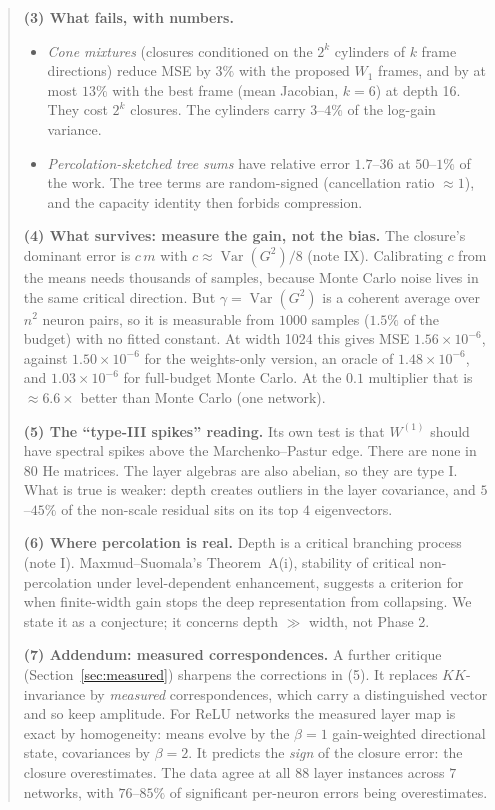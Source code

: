 \documentclass[11pt]{article}
\theoremstyle{definition}
\theoremstyle{remark}
\begin{document}
\begin{abstract}
\textbf{(3) What fails, with numbers.}
\begin{itemize}
\item \emph{Cone mixtures} (closures conditioned on the $2^k$ cylinders of $k$ frame directions) reduce MSE by $3\%$ with the proposed $W_1$ frames, and by at most $13\%$ with the best frame (mean Jacobian, $k=6$) at depth 16. They cost $2^k$ closures. The cylinders carry $3$--$4\%$ of the log-gain variance.
\item \emph{Percolation-sketched tree sums} have relative error $1.7$--$36$ at $50$--$1\%$ of the work. The tree terms are random-signed (cancellation ratio $\approx1$), and the capacity identity then forbids compression.
\end{itemize}

\textbf{(4) What survives: measure the gain, not the bias.} The closure's dominant error is $c\,m$ with $c\approx\operatorname{Var}(G^2)/8$ (note IX). Calibrating $c$ from the means needs thousands of samples, because Monte Carlo noise lives in the same critical direction. But $\gamma=\operatorname{Var}(G^2)$ is a coherent average over $n^2$ neuron pairs, so it is measurable from $1000$ samples ($1.5\%$ of the budget) with no fitted constant. At width 1024 this gives MSE $1.56\times10^{-6}$, against $1.50\times10^{-6}$ for the weights-only version, an oracle of $1.48\times10^{-6}$, and $1.03\times10^{-6}$ for full-budget Monte Carlo. At the $0.1$ multiplier that is $\approx6.6\times$ better than Monte Carlo (one network).

\textbf{(5) The ``type-III spikes'' reading.} Its own test is that $W^{(1)}$ should have spectral spikes above the Marchenko--Pastur edge. There are none in $80$ He matrices. The layer algebras are also abelian, so they are type I. What is true is weaker: depth creates outliers in the layer covariance, and $5$--$45\%$ of the non-scale residual sits on its top $4$ eigenvectors.

\textbf{(6) Where percolation is real.} Depth is a critical branching process (note I). Maxmud--Suomala's Theorem~A(i), stability of critical non-percolation under level-dependent enhancement, suggests a criterion for when finite-width gain stops the deep representation from collapsing. We state it as a conjecture; it concerns depth $\gg$ width, not Phase 2.

\textbf{(7) Addendum: measured correspondences.} A further critique (Section~\ref{sec:measured}) sharpens the corrections in (5). It replaces $KK$-invariance by \emph{measured} correspondences, which carry a distinguished vector and so keep amplitude. For ReLU networks the measured layer map is exact by homogeneity: means evolve by the $\beta=1$ gain-weighted directional state, covariances by $\beta=2$. It predicts the \emph{sign} of the closure error: the closure overestimates. The data agree at all $88$ layer instances across $7$ networks, with $76$--$85\%$ of significant per-neuron errors being overestimates.
\end{abstract}
\end{document}
